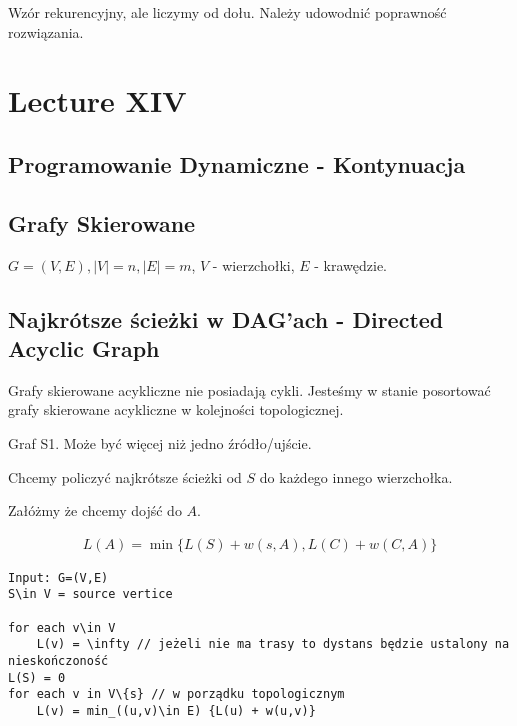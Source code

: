 \documentclass{article}
\numberwithin{equation}{subsection}
\begin{document}
Wzór rekurencyjny, ale liczymy od dołu. Należy udowodnić poprawność rozwiązania.

\section{Lecture XIV}

\subsection{Programowanie Dynamiczne - Kontynuacja}

\subsection{Grafy Skierowane}

$G=(V,E), |V|=n, |E|=m$, $V$ - wierzchołki, $E$ - krawędzie.\\


\subsection{Najkrótsze ścieżki w DAG'ach - Directed Acyclic Graph}

Grafy skierowane acykliczne nie posiadają cykli. Jesteśmy w stanie posortować grafy skierowane acykliczne w kolejności topologicznej.

Graf S1. Może być więcej niż jedno źródło/ujście.

\noindent
Chcemy policzyć najkrótsze ścieżki od $S$ do każdego innego wierzchołka.

Załóżmy że chcemy dojść do $A$.

\begin{align}
    L(A) = \min\{L(S) + w(s,A), L(C) + w(C,A)\}
\end{align}

\begin{verbatim}
Input: G=(V,E)
S\in V = source vertice

for each v\in V
    L(v) = \infty // jeżeli nie ma trasy to dystans będzie ustalony na nieskończoność
L(S) = 0
for each v in V\{s} // w porządku topologicznym
    L(v) = min_((u,v)\in E) {L(u) + w(u,v)}
\end{verbatim}
\end{document}
